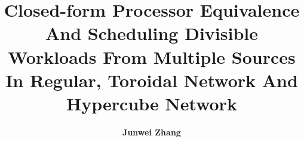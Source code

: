 \dissertation

\title{Closed-form Processor Equivalence And Scheduling Divisible Workloads From Multiple Sources In Regular, Toroidal Network And Hypercube Network}
\author{{\bf Junwei Zhang}}

\maketitle

\begin{approval}
\end{approval}
 
\begin{spacing}{\doublespace}
\begin{abstract}

\end{abstract}
 
\begin{dedication}

\end{dedication}
 
\tableofcontents
\listoffigures
\listoftables
\end{spacing}

\begin{spacing}{}
\begin{acknowledgements}

\end{acknowledgements}
\end{spacing}


